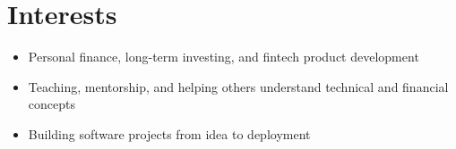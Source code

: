 \documentclass[letterpaper,11pt]{article}
\newcommand{\resumeItem}[1]{
  \item\small{
    {#1 \vspace{-2pt}}
  }
}
\newcommand{\resumeItemListStart}{\begin{itemize}}
\newcommand{\resumeItemListEnd}{\end{itemize}\vspace{-5pt}}
\begin{document}
\section{Interests}
\resumeItemListStart
  \resumeItem{Personal finance, long-term investing, and fintech product development}
  \resumeItem{Teaching, mentorship, and helping others understand technical and financial concepts}
  \resumeItem{Building software projects from idea to deployment}
\resumeItemListEnd
\end{document}
